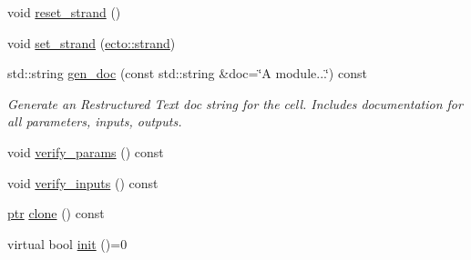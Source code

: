 \begin{DoxyCompactItemize}
void \hyperlink{structecto_1_1cell_af32a9e2113b7afcb5b225bdc3c234e8c}{reset\-\_\-strand} ()
\item 
void \hyperlink{structecto_1_1cell_ae0009fc4a4d12d400126f455396f5c9f}{set\-\_\-strand} (\hyperlink{structecto_1_1strand}{ecto\-::strand})
\item 
std\-::string \hyperlink{structecto_1_1cell_a486454d7466c5f0373ecb42dd4e97b2f}{gen\-\_\-doc} (const std\-::string \&doc=\char`\"{}\-A module...\char`\"{}) const 
\begin{DoxyCompactList}\small\item\em \-Generate an \-Restructured \-Text doc string for the cell. \-Includes documentation for all parameters, inputs, outputs. \end{DoxyCompactList}\item 
void \hyperlink{structecto_1_1cell_aa03c0f569bb4b14e81f4d2a8747273e5}{verify\-\_\-params} () const 
\item 
void \hyperlink{structecto_1_1cell_aed712e80344ce04dbb9105bb6a1aa53a}{verify\-\_\-inputs} () const 
\item 
\hyperlink{structecto_1_1cell_af2cab9d2bc012088c4f58c40da57a862}{ptr} \hyperlink{structecto_1_1cell_a213dabd285300f5d4c7e0f5fd6142e81}{clone} () const 
\item 
virtual bool \hyperlink{structecto_1_1cell_ab9a6c3fd8f76289f338a9e05368b1aff}{init} ()=0
\end{DoxyCompactItemize}
